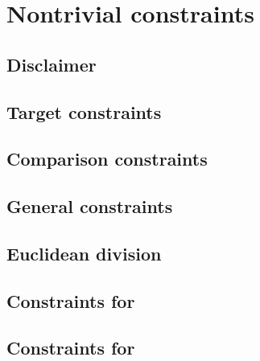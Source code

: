\section{Nontrivial constraints}
\subsection{Disclaimer} 
\subsection{Target constraints} 
\subsection{Comparison constraints} \label{subsec (alu/ext): comparison constraints} 
\subsection{General constraints} 
\subsection{Euclidean division} 
\subsection{Constraints for } 
\subsection{Constraints for } 
